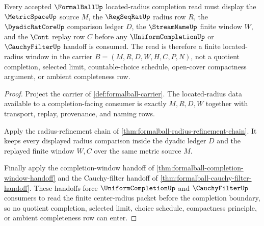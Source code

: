 \begin{theorem}
\label{thm:formalball-located-radius-window}
Every accepted $\FormalBallUp$ located-radius completion read must display the $\MetricSpaceUp$ source $M$, the $\RegSeqRatUp$ radius row $R$, the $\DyadicRatCoreUp$ comparison ledger $D$, the $\StreamNameUp$ finite window $W$, and the $\Cont$ replay row $C$ before any $\UniformCompletionUp$ or $\CauchyFilterUp$ handoff is consumed. The read is therefore a finite located-radius window in the carrier $B=(M,R,D,W,H,C,P,N)$, not a quotient completion, selected limit, countable-choice schedule, open-cover compactness argument, or ambient completeness row.
\end{theorem}
\begin{proof}
Project the carrier of \autoref{def:formalball-carrier}. The located-radius data available to a completion-facing consumer is exactly $M,R,D,W$ together with transport, replay, provenance, and naming rows.

Apply the radius-refinement chain of \autoref{thm:formalball-radius-refinement-chain}. It keeps every displayed radius comparison inside the dyadic ledger $D$ and the replayed finite window $W,C$ over the same metric source $M$.

Finally apply the completion-window handoff of \autoref{thm:formalball-completion-window-handoff} and the Cauchy-filter handoff of \autoref{thm:formalball-cauchy-filter-handoff}. These handoffs force $\UniformCompletionUp$ and $\CauchyFilterUp$ consumers to read the finite center-radius packet before the completion boundary, so no quotient completion, selected limit, choice schedule, compactness principle, or ambient completeness row can enter.
\end{proof}

